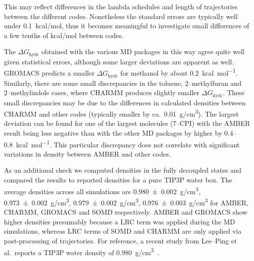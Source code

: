 \documentclass[journal=jctcce,manuscript=article]{achemso}
\begin{document}
  This may reflect differences in the lambda schedules and
length of trajectories between the different codes.  Nonetheless the
standard errors are typically well under \SI{0.1}{kcal/mol}, thus it
becomes meaningful to investigate small differences of a few tenths of
\si{kcal/mol} between codes.

The $\Delta G_{\mathrm{hydr}}$
obtained with the various MD packages in
this way agree quite well given statistical errors, although some larger deviations are apparent as
well.  GROMACS predicts a smaller $\Delta G_{\mathrm{hydr}}$ for
methanol by about \SI{+0.2}{kcal.mol^{-1}}.  Similarly, there are some
small discrepancies in the toluene, 2--methylfuran and 2--methylindole
cases, where CHARMM produces slightly smaller $\Delta
G_{\mathrm{hydr}}$.  These small discrepancies may be due to the
differences in calculated densities between CHARMM and other codes
(typically smaller by ca.\ \SI{0.01}{g/cm^3}).
The largest deviation can be found for one of the largest
molecules (7--CPI) with the AMBER result being less negative than with
the other MD packages by higher by 0.4--\SI{0.8}{kcal.mol^{-1}}.  This
particular discrepancy does not correlate with significant variations
in density between AMBER and other codes.

As an additional check we computed densities in the fully decoupled
states and compared the results to reported densities for a pure TIP3P
water box.  The average densities across all simulations are
\SI{0.980+-0.002}{g/cm^3}, \SI{0.973+-0.002}{g/cm^3},
\SI{0.979+-0.002}{g/cm^3}, \SI{0.976+-0.003}{g/cm^3} for AMBER,
CHARMM, GROMACS and SOMD respectively.  AMBER and GROMACS show higher
densities presumably because a LRC term was applied during the MD
simulations, whereas {\color{blue}LRC terms of SOMD and CHARMM are only applied via
post-processing of trajectories.}  For reference, a recent study from Lee--Ping et al.\ reports a
TIP3P water density of \SI{0.980}{g/cm^3}~\cite{doi:10.1021/jz500737m}.
\end{document}
